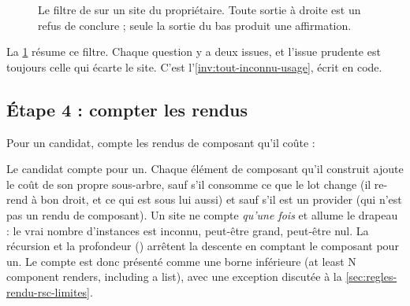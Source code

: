 \begin{figure}[htbp]\centering
{}
\caption{Le filtre de  sur un site du propriétaire. Toute sortie à droite
est un refus de conclure ; seule la sortie du bas produit une affirmation.}
\label{fig:rendu-filtre}
\end{figure}

La \cref{fig:rendu-filtre} résume ce filtre. Chaque question y a deux issues, et l'issue
prudente est toujours celle qui écarte le site. C'est l'\cref{inv:tout-inconnu-usage}, écrit en
code.

\subsection{Étape 4 : compter les rendus}

Pour un candidat,  compte les rendus de composant qu'il coûte :


Le candidat compte pour un. Chaque élément de composant qu'il construit ajoute le coût de son
propre sous-arbre, sauf s'il consomme ce que le lot change (il re-rend à bon droit, et ce qui est
sous lui aussi) et sauf s'il est un provider (qui n'est pas un rendu de composant). Un site
 ne compte \emph{qu'une fois} et allume le drapeau  : le vrai nombre
d'instances est inconnu, peut-être grand, peut-être nul. La récursion et la profondeur
() arrêtent la descente en comptant le composant pour un. Le compte est donc
présenté comme une borne inférieure (\og at least N component renders, including a list\fg{}),
avec une exception discutée à la \cref{sec:regles-rendu-rsc-limites}.

